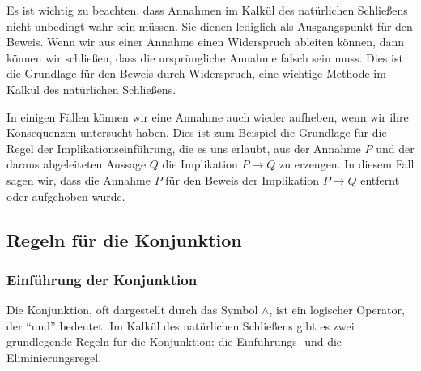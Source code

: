 \documentclass{book}
\theoremstyle{plain}
\theoremstyle{remark}
\theoremstyle{definition}
\begin{document}
Es ist wichtig zu beachten, dass Annahmen im Kalkül des natürlichen Schließens nicht unbedingt wahr sein müssen. Sie dienen lediglich als Ausgangspunkt für den Beweis. Wenn wir aus einer Annahme einen Widerspruch ableiten können, dann können wir schließen, dass die ursprüngliche Annahme falsch sein muss. Dies ist die Grundlage für den Beweis durch Widerspruch, eine wichtige Methode im Kalkül des natürlichen Schließens.

In einigen Fällen können wir eine Annahme auch wieder aufheben, wenn wir ihre Konsequenzen untersucht haben. Dies ist zum Beispiel die Grundlage für die Regel der Implikationseinführung, die es uns erlaubt, aus der Annahme \(P\) und der daraus abgeleiteten Aussage \(Q\) die Implikation \(P \rightarrow Q\) zu erzeugen. In diesem Fall sagen wir, dass die Annahme \(P\) für den Beweis der Implikation \(P \rightarrow Q\) entfernt oder aufgehoben wurde.


\subsection{Regeln für die Konjunktion}

\subsubsection{Einführung der Konjunktion}
\label{rule:AI}
Die Konjunktion, oft dargestellt durch das Symbol \(\land\), ist ein logischer Operator, der \enquote{und} bedeutet. Im Kalkül des natürlichen Schließens gibt es zwei grundlegende Regeln für die Konjunktion: die Einführungs- und die Eliminierungsregel.
\end{document}
